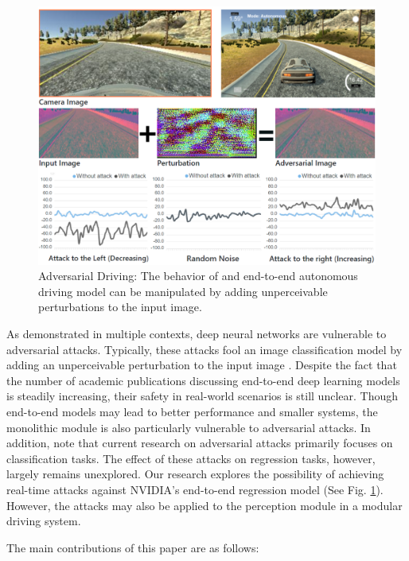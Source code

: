 \begin{figure}[tbp]
    \centering
    \includegraphics[width=0.76 \textwidth]{figures/chapter_driving/overview.png}
    \caption{Adversarial Driving: The behavior of and end-to-end autonomous driving model can be manipulated by adding unperceivable perturbations to the input image.}
    \label{fig:adv_drv}
\end{figure} 

As demonstrated in multiple contexts, deep neural networks are vulnerable to adversarial attacks. Typically, these attacks fool an image classification model by adding an unperceivable perturbation to the input image \cite{goodfellow2014explaining}. Despite the fact that the number of academic publications discussing end-to-end deep learning models is steadily increasing, their safety in real-world scenarios is still unclear. Though end-to-end models may lead to better performance and smaller systems, the monolithic module is also particularly vulnerable to adversarial attacks. In addition, note that current research on adversarial attacks primarily focuses on classification tasks. The effect of these attacks on regression tasks, however, largely remains unexplored. Our research explores the possibility of achieving real-time attacks against NVIDIA's end-to-end regression model (See Fig. \ref{fig:adv_drv}). However, the attacks may also be applied to the perception module in a modular driving system.


The main contributions of this paper are as follows: 

